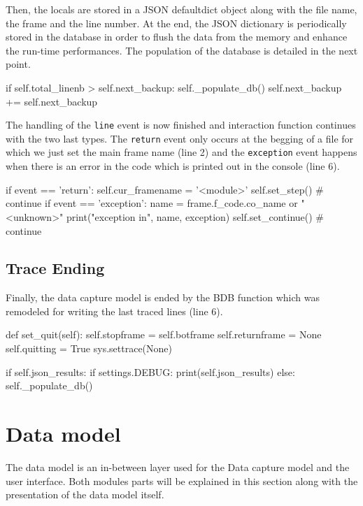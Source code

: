 Then, the locals are stored in a JSON defaultdict object along with the file name, the frame and the line number. At the end, the JSON dictionary is periodically stored in the database in order to flush the data from the memory and enhance the run-time performances. The population of the database is detailed in the next point.

\begin{python}
if self.total_linenb > self.next_backup:
    self._populate_db()
    self.next_backup += self.next_backup
\end{python}

The handling of the \texttt{line} event is now finished and interaction function continues with the two last types. The \texttt{return} event only occurs at the begging of a file for which we just set the main frame name (line 2) and the \texttt{exception} event happens when there is an error in the code which is printed out in the console (line 6).
\begin{python}
if event == 'return':
    self.cur_framename = '<module>'
    self.set_step()  # continue
if event == 'exception':
    name = frame.f_code.co_name or "<unknown>"
    print("exception in", name, exception)
    self.set_continue()  # continue
\end{python}

\subsection{Trace Ending}

Finally, the data capture model is ended by the  BDB function which was remodeled for writing the last traced lines (line 6).
\begin{python}
def set_quit(self):
    self.stopframe = self.botframe
    self.returnframe = None
    self.quitting = True
    sys.settrace(None)

    if self.json_results:
        if settings.DEBUG:
            print(self.json_results)
        else:
            self._populate_db()
\end{python}



\section{Data model}
The data model is an in-between layer used for the Data capture model and the user interface. Both modules parts will be explained in this section along with the presentation of the data model itself.

